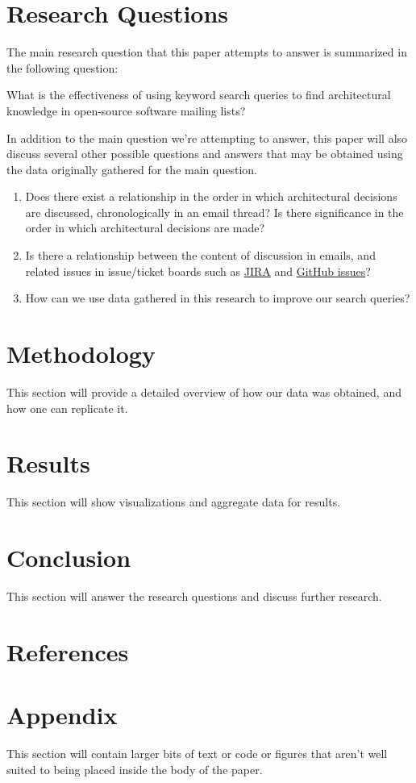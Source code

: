 \documentclass[a4paper, 12pt]{article}
\begin{document}
\section{Research Questions}
	The main research question that this paper attempts to answer is summarized in the following question:
	
	\begin{center}
		\large What is the effectiveness of using keyword search queries to find architectural knowledge in open-source software mailing lists?
	\end{center}
	
	In addition to the main question we're attempting to answer, this paper will also discuss several other possible questions and answers that may be obtained using the data originally gathered for the main question.
	
	\begin{enumerate}
		\item Does there exist a relationship in the order in which architectural decisions are discussed, chronologically in an email thread? Is there significance in the order in which architectural decisions are made?
		
		\item Is there a relationship between the content of discussion in emails, and related issues in issue/ticket boards such as \href{https://www.atlassian.com/software/jira}{JIRA} and \href{https://github.com/features/issues}{GitHub issues}?
		
		\item How can we use data gathered in this research to improve our search queries?
	\end{enumerate}

\section{Methodology}
	This section will provide a detailed overview of how our data was obtained, and how one can replicate it.

\section{Results}
	This section will show visualizations and aggregate data for results.

\section{Conclusion}
	This section will answer the research questions and discuss further research.

\section{References}
	\printbibliography[heading=none]

\section{Appendix}
	This section will contain larger bits of text or code or figures that aren't well suited to being placed inside the body of the paper.
\end{document}
